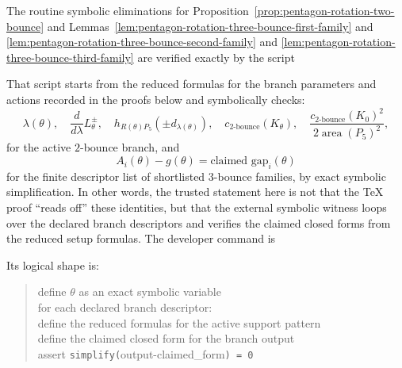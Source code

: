 \begin{unverified}
\begin{remark}
\label{rem:pentagon-rotation-cas-witness}
The routine symbolic eliminations for
Proposition~\ref{prop:pentagon-rotation-two-bounce} and
Lemmas~\ref{lem:pentagon-rotation-three-bounce-first-family} and
\ref{lem:pentagon-rotation-three-bounce-second-family} and
\ref{lem:pentagon-rotation-three-bounce-third-family} are verified exactly by
the script
\begin{quote}\small{}\end{quote}
That script starts from the reduced formulas for the branch parameters and
actions recorded in the proofs below and symbolically checks:
\[
  \lambda(\theta), \quad
  \frac{d}{d\lambda}L_\theta^\pm, \quad
  h_{R(\theta)P_5}(\pm d_{\lambda(\theta)}), \quad
  c_{2\text{-bounce}}(K_\theta), \quad
  \frac{c_{2\text{-bounce}}(K_0)^2}{2\operatorname{area}(P_5)^2},
\]
for the active $2$-bounce branch, and
\[
  A_i(\theta) - g(\theta) = \text{claimed gap}_i(\theta)
\]
for the finite descriptor list of shortlisted $3$-bounce families, by exact
symbolic simplification. In other words, the trusted statement here is not that
the TeX proof ``reads off'' these identities, but that the external symbolic
witness loops over the declared branch descriptors and verifies the claimed
closed forms from the reduced setup formulas. The developer command is
\begin{quote}\small{}\end{quote}
Its logical shape is:
\begin{quote}\ttfamily
define $\theta$ as an exact symbolic variable\\
for each declared branch descriptor:\\
\qquad define the reduced formulas for the active support pattern\\
\qquad define the claimed closed form for the branch output\\
\qquad assert \texttt{simplify(}output-claimed\_form\texttt{) = 0}
\end{quote}
\end{remark}
\end{unverified}

